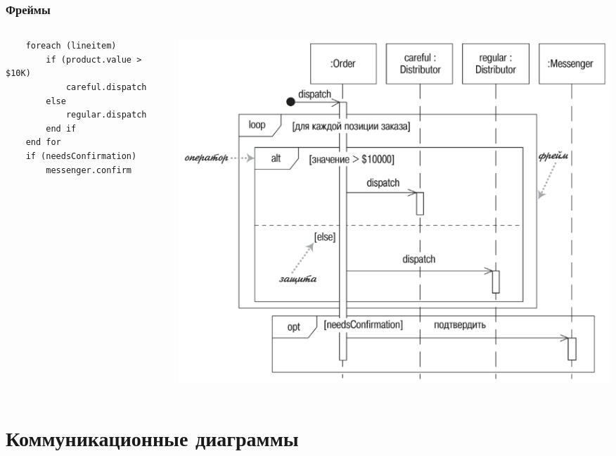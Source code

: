 \documentclass{../../slides-style}
\begin{document}
    \begin{frame}[fragile]
        \frametitle{Фреймы}
        \begin{columns}
            \begin{column}{0.5\textwidth}
                \begin{small}
                    \begin{verbatim}
    foreach (lineitem)
        if (product.value > $10K)
            careful.dispatch
        else
            regular.dispatch
        end if
    end for
    if (needsConfirmation) 
        messenger.confirm
                    \end{verbatim}
                \end{small}
            \end{column}
            \begin{column}{0.5\textwidth}
                \begin{center}
                    \includegraphics[width=\textwidth]{sequenceDiagramFrames.png}
                \end{center}
            \end{column}
        \end{columns}
    \end{frame}

    \section{Коммуникационные диаграммы}
\end{document}
